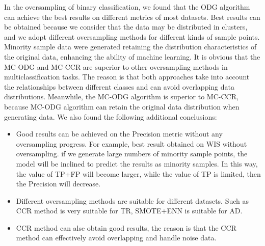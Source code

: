 \documentclass[runningheads]{llncs}
\begin{document}
In the oversampling of binary classification, 
we found that the ODG algorithm can achieve the best 
results on different metrics of most datasets.
Best results can be obtained because we consider 
that the data may be distributed in clusters, 
and we adopt different oversampling methods for different kinds of sample points.
Minority sample data were generated retaining 
the distribution characteristics of the original data, 
enhancing the ability of machine learning.
It is obvious that the MC-ODG and MC-CCR are superior 
to other oversampling methods in  
multiclassification tasks. 
The reason is that both approaches take into account 
the relationships between different classes and
can avoid overlapping data distributions.
Meanwhile, the MC-ODG algorithm is superior to MC-CCR, because MC-ODG
algorithm can retain the original data distribution when generating data.
We also found the following additional conclusions:
\begin{itemize}
  \item Good results can be achieved on the Precision metric without any oversampling progress. 
  For example, best result obtained on WIS without oversampling.
   if we generate large numbers of minority sample points, 
   the model will be inclined to predict the results as minority samples. In this way, 
   the value of TP+FP will become larger, while the value of TP is limited, then the Precision will decrease.
  \item Different oversampling methods are suitable for different datasets. 
  Such as CCR method is very suitable for TR, SMOTE+ENN is suitable for AD.
  \item CCR method can alse obtain good results, 
  the reason is that the CCR method can effectively avoid overlapping and handle noise data.
\end{itemize}

\end{document}
